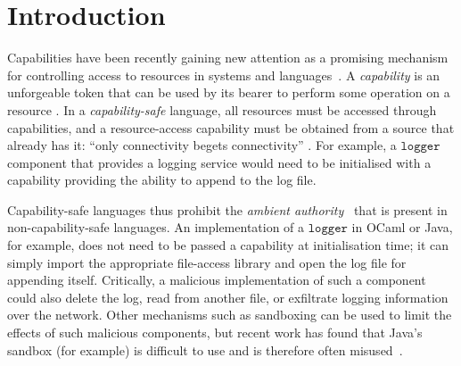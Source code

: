 \documentclass[sigplan,10pt,review]{acmart}\settopmatter{printfolios=true,printccs=false,printacmref=false}
\newcommand{\kwat}[1]{$\kwa{#1}$}
\newcommand{\kwa}[1]{\mathtt{#1}}
\begin{document}


\maketitle

\section{Introduction}

Capabilities have been recently gaining new attention as a promising mechanism for controlling access to resources in systems and languages~\cite{miller03,drossopoulou07,dimoulas14,devriese16}.
A \textit{capability} is an unforgeable token that can be used by its bearer to perform some operation on a resource \cite{dennis66}.
In a \textit{capability-safe} language, all resources must be accessed through capabilities, and a resource-access capability must be obtained from a source that already has it: ``only connectivity begets connectivity'' \cite{miller03}.
For example, a \kwat{logger} component that provides a logging service would need to be initialised with a capability providing the ability to append to the log file.

Capability-safe languages thus prohibit the \textit{ambient authority}~\cite{miller06} that is present in non-capability-safe languages.
An implementation of a \kwat{logger} in OCaml or Java, for example, does not need to be passed a capability at initialisation time; it can simply import the appropriate file-access library and open the log file for appending itself.
Critically, a malicious implementation of such a component could also delete the log, read from another file, or exfiltrate logging information over the network.
Other mechanisms such as sandboxing can be used to limit the effects of such malicious components, but recent work has found that Java's sandbox (for example) is difficult to use and is therefore often misused~\cite{coker15, maass16}.
\end{document}
